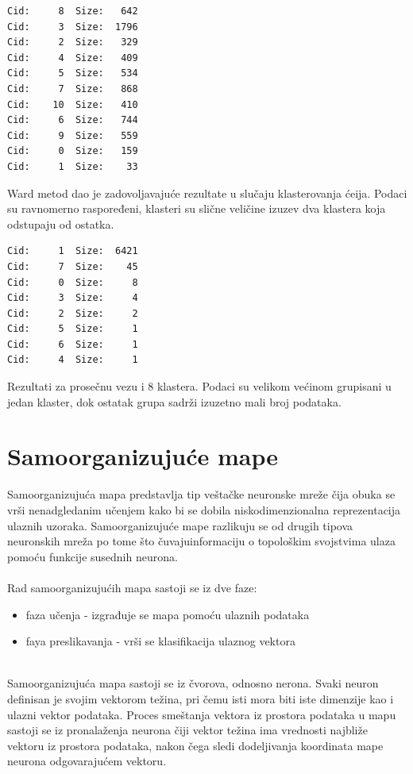 \documentclass[a4paper]{article}
\begin{document}
\begin{tcolorbox}
\begin{verbatim}
Cid:     8  Size:   642
Cid:     3  Size:  1796
Cid:     2  Size:   329
Cid:     4  Size:   409
Cid:     5  Size:   534
Cid:     7  Size:   868
Cid:    10  Size:   410
Cid:     6  Size:   744
Cid:     9  Size:   559
Cid:     0  Size:   159
Cid:     1  Size:    33

\end{verbatim}
\end{tcolorbox}

Ward metod dao je zadovoljavajuće rezultate u slučaju klasterovanja ćeija. Podaci su ravnomerno raspoređeni, klasteri su slične veličine izuzev dva klastera koja odstupaju od ostatka.

\begin{tcolorbox}
\begin{verbatim}
Cid:     1  Size:  6421
Cid:     7  Size:    45
Cid:     0  Size:     8
Cid:     3  Size:     4
Cid:     2  Size:     2
Cid:     5  Size:     1
Cid:     6  Size:     1
Cid:     4  Size:     1
\end{verbatim}
\end{tcolorbox}

Rezultati za prosečnu vezu i 8 klastera. Podaci su velikom većinom grupisani u jedan klaster, dok ostatak grupa sadrži izuzetno mali broj podataka.


\section{Samoorganizujuće mape}
 
Samoorganizujuća mapa predstavlja tip veštačke neuronske
mreže čija obuka se vrši nenadgledanim učenjem kako bi se dobila niskodimenzionalna
reprezentacija ulaznih uzoraka.
Samoorganizujuće mape razlikuju se od drugih tipova neuronskih mreža po tome što čuvajuinformaciju o
topološkim svojstvima ulaza pomoću funkcije susednih neurona.
\\
\\
Rad samoorganizujućih mapa sastoji se iz dve faze: 
    \begin{itemize}
        \item faza učenja - izgrađuje se mapa pomoću ulaznih podataka
        \item faya preslikavanja - vrši se klasifikacija ulaznog vektora
    \end{itemize}
\\

Samoorganizujuća mapa sastoji se iz čvorova, odnosno nerona. Svaki neuron definisan je svojim vektorom težina, pri čemu isti mora biti iste dimenzije kao i ulazni vektor podataka. Proces smeštanja vektora iz prostora podataka u mapu sastoji se iz pronalaženja neurona čiji vektor težina ima vrednosti najbliže vektoru iz prostora podataka, nakon čega sledi dodeljivanja koordinata mape neurona odgovarajućem vektoru.    
\end{document}
